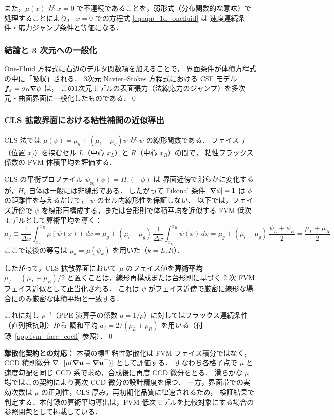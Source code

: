 また，$\mu(x)$ が $x = 0$ で不連続であることを，弱形式（分布関数的な意味）で処理することにより，
$x=0$ での方程式 \eqref{eq:app_1d_onefluid} は
速度連続条件・応力ジャンプ条件と等価になる．

\subsubsection*{結論と 3 次元への一般化}

One-Fluid 方程式に右辺のデルタ関数項を加えることで，
界面条件が体積方程式の中に「吸収」される．
3次元 Navier--Stokes 方程式における CSF モデル $\bm{f}_\sigma = \sigma\kappa\bm{\nabla}\psi$ は，
この1次元モデルの表面張力（法線応力のジャンプ）を多次元・曲面界面に一般化したものである．\qed

\subsubsection*{CLS 拡散界面における粘性補間の近似導出}
\label{app:mu_interp_derivation}

CLS 法では $\mu(\psi) = \mu_g + (\mu_l - \mu_g)\psi$ が $\psi$ の線形関数である．
フェイス $f$（位置 $x_f$）を挟むセル $L$（中心 $x_L$）と $R$（中心 $x_R$）の間で，
粘性フラックス係数の FVM 体積平均を評価する．

CLS の平衡プロファイル $\psi_{\mathrm{eq}}(\phi) = H_\varepsilon(-\phi)$ は
界面近傍で滑らかに変化するが，$H_\varepsilon$ 自体は一般には非線形である．
したがって Eikonal 条件 $|\bm{\nabla}\phi|=1$ は $\phi$ の距離性を与えるだけで，
$\psi$ のセル内線形性を保証しない．
以下では，フェイス近傍で $\psi$ を線形再構成する，または台形則で体積平均を近似する
FVM 低次モデルとして算術平均を導く：
\[
  \bar{\mu}_f
  \equiv \frac{1}{\Delta x}\int_{x_L}^{x_R} \mu(\psi(x))\,dx
  = \mu_g + (\mu_l-\mu_g)\,\frac{1}{\Delta x}\int_{x_L}^{x_R}\psi(x)\,dx
  = \mu_g + (\mu_l-\mu_g)\,\frac{\psi_L+\psi_R}{2}
  = \frac{\mu_L+\mu_R}{2}
\]
ここで最後の等号は $\mu_k = \mu(\psi_k)$ を用いた（$k=L,R$）．

したがって，CLS 拡散界面において $\mu$ のフェイス値を\textbf{算術平均}
$\mu_f = (\mu_L+\mu_R)/2$ と置くことは，線形再構成または台形則に基づく
2 次 FVM フェイス近似として正当化される．
これは $\psi$ がフェイス近傍で厳密に線形な場合にのみ厳密な体積平均と一致する．

これに対し $\rho^{-1}$（PPE 演算子の係数 $a = 1/\rho$）に対してはフラックス連続条件（直列抵抗則）から
調和平均 $a_f = 2/(\rho_L+\rho_R)$ を用いる（付録~\ref{app:fvm_face_coeff} 参照）．\qed

\noindent\textbf{離散化契約との対応：}
本稿の標準粘性離散化は FVM フェイス積分ではなく，
CCD 積則微分 $\nabla\cdot[\mu(\bm{\nabla}\bm{u}+\bm{\nabla}\bm{u}^\top)]$ として評価する．
すなわち各格子点で $\mu$ と速度勾配を同じ CCD 系で求め，合成後に再度 CCD 微分をとる．
滑らかな $\mu$ 場ではこの契約により高次 CCD 微分の設計精度を保つ．
一方，界面帯での実効次数は $\mu$ の正則性，CLS 厚み，再初期化品質に律速されるため，
検証結果で判定する．本付録の算術平均導出は，FVM 低次モデルを比較対象にする場合の
参照閉包として掲載している．

